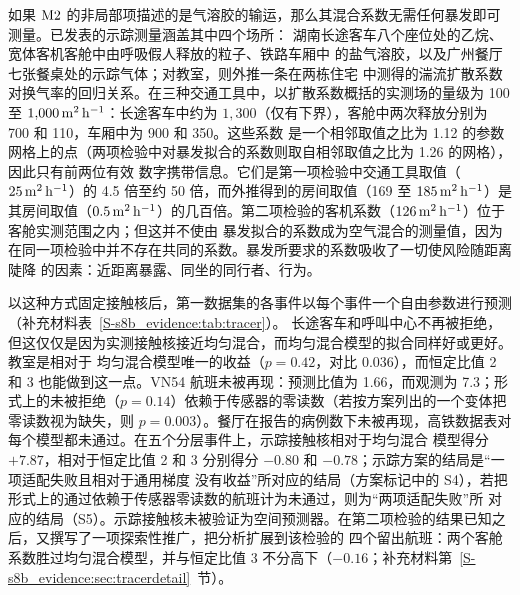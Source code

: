 如果 $\mathrm{M2}$ 的非局部项描述的是气溶胶的输运，那么其混合系数无需任何暴发即可测量。已发表的示踪测量涵盖其中四个场所：
湖南长途客车八个座位处的乙烷\citep{ou2022}、宽体客机客舱中由呼吸假人释放的粒子\citep{kinahan2021aerosol}、铁路车厢中
的盐气溶胶\citep{woodward2022evaluation}，以及广州餐厅七张餐桌处的示踪气体\citep{li2021}；对教室，则外推一条在两栋住宅
中测得的湍流扩散系数对换气率的回归关系\citep{cheng2011modeling}。在三种交通工具中，以扩散系数概括的实测场的量级为 100
至 $1{,}000\,\mathrm{m}^2\,\mathrm{h}^{-1}$：长途客车中约为 $1{,}300$（仅有下界），客舱中两次释放分别为 700 和 110，车厢中为 900 和 350。这些系数
是一个相邻取值之比为 1.12 的参数网格上的点（两项检验中对暴发拟合的系数则取自相邻取值之比为 1.26 的网格），因此只有前两位有效
数字携带信息。它们是第一项检验中交通工具取值（$25\,\mathrm{m}^2\,\mathrm{h}^{-1}$）的 4.5 倍至约 50 倍，而外推得到的房间取值（169 至
$185\,\mathrm{m}^2\,\mathrm{h}^{-1}$）是其房间取值（$0.5\,\mathrm{m}^2\,\mathrm{h}^{-1}$）的几百倍。第二项检验的客机系数（$126\,\mathrm{m}^2\,\mathrm{h}^{-1}$）位于客舱实测范围之内；但这并不使由
暴发拟合的系数成为空气混合的测量值，因为在同一项检验中并不存在共同的系数。暴发所要求的系数吸收了一切使风险随距离陡降
的因素：近距离暴露、同坐的同行者、行为。

以这种方式固定接触核后，第一数据集的各事件以每个事件一个自由参数进行预测（补充材料表~\ref{S-s8b_evidence:tab:tracer}）。
长途客车和呼叫中心不再被拒绝，但这仅仅是因为实测接触核接近均匀混合，而均匀混合模型的拟合同样好或更好。教室是相对于
均匀混合模型唯一的收益（$p=0.42$，对比 $0.036$），而恒定比值 2 和 3 也能做到这一点。VN54 航班未被再现：预测比值为
1.66，而观测为 7.3；形式上的未被拒绝（$p=0.14$）依赖于传感器的零读数（若按方案列出的一个变体把零读数视为缺失，则
$p=0.003$）。餐厅在报告的病例数下未被再现，高铁数据表对每个模型都未通过。在五个分层事件上，示踪接触核相对于均匀混合
模型得分 $+7.87$，相对于恒定比值 2 和 3 分别得分 $-0.80$ 和 $-0.78$；示踪方案的结局是“一项适配失败且相对于通用梯度
没有收益”所对应的结局（方案标记中的 S4），若把形式上的通过依赖于传感器零读数的航班计为未通过，则为“两项适配失败”所
对应的结局（S5）。示踪接触核未被验证为空间预测器。在第二项检验的结果已知之后，又撰写了一项探索性推广，把分析扩展到该检验的
四个留出航班：两个客舱系数胜过均匀混合模型，并与恒定比值 3 不分高下（$-0.16$；补充材料第~\ref{S-s8b_evidence:sec:tracerdetail}~节）。

